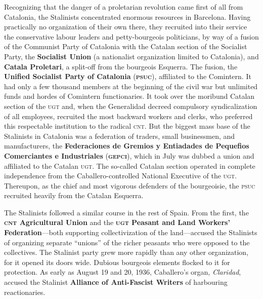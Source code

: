 Recognizing that the danger of a proletarian revolution came first of all from Catalonia, the Stalinists concentrated enormous resources in Barcelona. Having practically no organization of their own there, they recruited into their service the conservative labour leaders and petty-bourgeois politicians, by way of a fusion of the Communist Party of Catalonia with the Catalan section of the Socialist Party, the \textbf{Socialist Union} (a nationalist organization limited to Catalonia), and \textbf{Catala Proletari}, a split-off from the bourgeois Esquerra. The fusion, the \textbf{Unified Socialist Party of Catalonia} (\textbf{\textsc{psuc}}), affiliated to the Comintern. It had only a few thousand members at the beginning of the civil war but unlimited funds and hordes of Comintern functionaries. It took over the moribund Catalan section of the \textsc{ugt} and, when the Generalidad decreed compulsory syndicalization of all employees, recruited the most backward workers and clerks, who preferred this respectable institution to the radical \textsc{cnt}. But the biggest mass base of the Stalinists in Catalonia was a federation of traders, small businessmen, and manufacturers, the \textbf{Federaciones de Gremios y Entiadades de Pequefios Comerciantes e Industriales} (\textbf{\textsc{gepci}}), which in July was dubbed a union and affiliated to the Catalan \textsc{ugt}. The so-called Catalan section operated in complete independence from the Caballero-controlled National Executive of the \textsc{ugt}. Thereupon, as the chief and most vigorous defenders of the bourgeoisie, the \textsc{psuc} recruited heavily from the Catalan Esquerra.

The Stalinists followed a similar course in the rest of Spain. From the first, the \textbf{\textsc{cnt} Agricultural Union} and the \textbf{\textsc{ugt} Peasant and Land Workers’ Federation}---both supporting collectivization of the land---accused the Stalinists of organizing separate ``unions'' of the richer peasants who were opposed to the collectives. The Stalinist party grew more rapidly than any other organization, for it opened its doors wide. Dubious bourgeois elements flocked to it for protection. As early as August 19 and 20, 1936, Caballero’s organ, \emph{Claridad}, accused the Stalinist \textbf{Alliance of Anti-Fascist Writers} of harbouring reactionaries.

